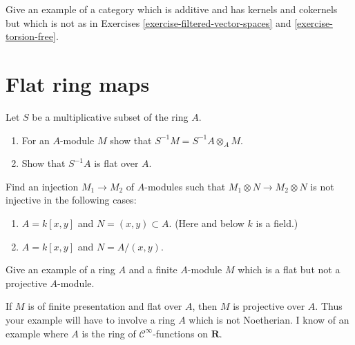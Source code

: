 \begin{exercise}
\label{exercise-other}
Give an example of a category which is additive and has kernels
and cokernels but which is not as in
Exercises \ref{exercise-filtered-vector-spaces} and
\ref{exercise-torsion-free}.
\end{exercise}






\section{Flat ring maps}
\label{section-flat}

\begin{exercise}
\label{exercise-localization-flat}
Let $S$ be a multiplicative subset of the ring $A$.
\begin{enumerate}
\item For an $A$-module $M$ show that $S^{-1}M = S^{-1}A\otimes_A M$.
\item Show that $S^{-1}A$ is flat over $A$.
\end{enumerate}
\end{exercise}

\begin{exercise}
\label{exercise-examples-not-flat}
Find an injection $M_1 \to M_2$ of $A$-modules such that
$M_1\otimes N \to M_2 \otimes N$ is not injective in the following
cases:
\begin{enumerate}
\item $A = k[x, y]$ and $N = (x, y) \subset A$. (Here and below $k$ is a field.)
\item $A = k[x, y]$ and $N = A/(x, y)$.
\end{enumerate}
\end{exercise}

\begin{exercise}
\label{exercise-flat-not-projective}
Give an example of a ring $A$ and a finite $A$-module $M$
which is a flat but not a projective $A$-module.
\end{exercise}

\begin{remark}
\label{remark-flat-not-projective}
If $M$ is of finite presentation and flat over $A$,
then $M$ is projective over $A$. Thus your example will have to
involve a ring $A$ which is not Noetherian. I know of an example
where $A$ is the ring of ${\mathcal C}^\infty$-functions on ${\mathbf R}$.
\end{remark}

